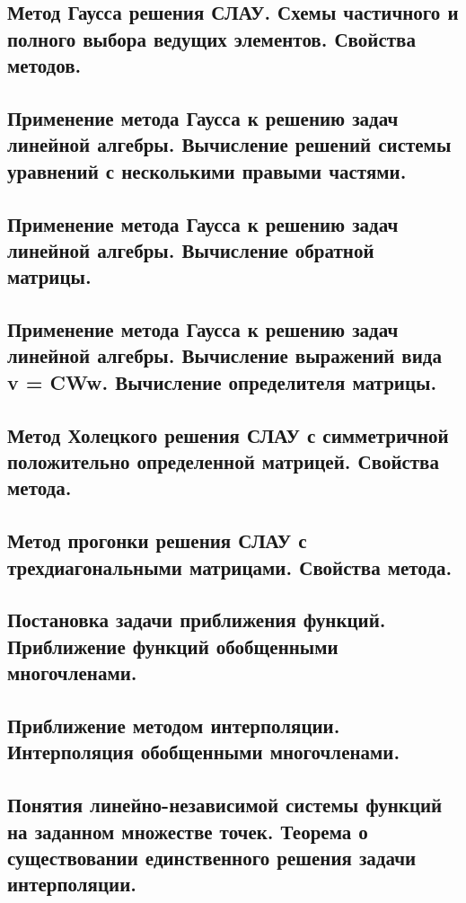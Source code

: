 \documentclass[14pt]{extarticle}
\begin{document}
\clearpage
\subsection{Метод Гаусса решения СЛАУ. Схемы частичного и полного выбора ведущих элементов. Свойства методов.}

\clearpage
\subsection{Применение метода Гаусса к решению задач линейной алгебры. Вычисление решений системы уравнений с несколькими правыми частями.}

\clearpage
\subsection{Применение метода Гаусса к решению задач линейной алгебры. Вычисление обратной матрицы.}

\clearpage
\subsection{Применение метода Гаусса к решению задач линейной алгебры. Вычисление выражений вида v = CWw. Вычисление определителя матрицы.}

\clearpage
\subsection{Метод Холецкого решения СЛАУ с симметричной положительно определенной матрицей. Свойства метода.}

\clearpage
\subsection{Метод прогонки решения СЛАУ с трехдиагональными матрицами. Свойства метода.}

\clearpage
\subsection{Постановка задачи приближения функций. Приближение функций обобщенными многочленами.}

\clearpage
\subsection{Приближение методом интерполяции. Интерполяция обобщенными многочленами.}

\clearpage
\subsection{Понятия линейно-независимой системы функций на заданном множестве точек. Теорема о существовании единственного решения задачи интерполяции.}
\end{document}
